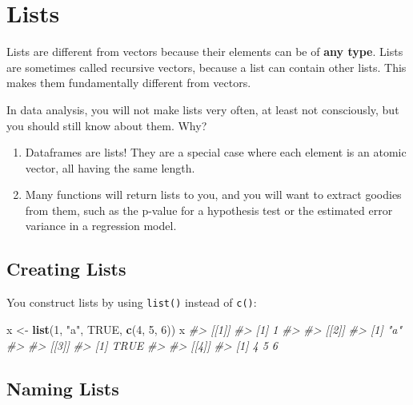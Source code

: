 \documentclass[
]{book}
\newenvironment{Shaded}{\begin{snugshade}}{\end{snugshade}}
\newcommand{\CommentTok}[1]{\textcolor[rgb]{0.56,0.35,0.01}{\textit{#1}}}
\newcommand{\DecValTok}[1]{\textcolor[rgb]{0.00,0.00,0.81}{#1}}
\newcommand{\KeywordTok}[1]{\textcolor[rgb]{0.13,0.29,0.53}{\textbf{#1}}}
\newcommand{\NormalTok}[1]{#1}
\newcommand{\OtherTok}[1]{\textcolor[rgb]{0.56,0.35,0.01}{#1}}
\newcommand{\StringTok}[1]{\textcolor[rgb]{0.31,0.60,0.02}{#1}}
\providecommand{\tightlist}{%
  \setlength{\itemsep}{0pt}\setlength{\parskip}{0pt}}
\begin{document}
\hypertarget{lists}{%
\section{Lists}\label{lists}}

Lists are different from vectors because their elements can be of \textbf{any type}. Lists are sometimes called recursive vectors, because a list can contain other lists. This makes them fundamentally different from vectors.

In data analysis, you will not make lists very often, at least not consciously, but you should still know about them. Why?

\begin{enumerate}
\def\labelenumi{\arabic{enumi}.}
\tightlist
\item
  Dataframes are lists! They are a special case where each element is an atomic vector, all having the same length.
\item
  Many functions will return lists to you, and you will want to extract goodies from them, such as the p-value for a hypothesis test or the estimated error variance in a regression model.
\end{enumerate}

\hypertarget{creating-lists}{%
\subsection{Creating Lists}\label{creating-lists}}

You construct lists by using \texttt{list()} instead of \texttt{c()}:

\begin{Shaded}
\begin{Highlighting}[]
\NormalTok{x <-}\StringTok{ }\KeywordTok{list}\NormalTok{(}\DecValTok{1}\NormalTok{, }\StringTok{"a"}\NormalTok{, }\OtherTok{TRUE}\NormalTok{, }\KeywordTok{c}\NormalTok{(}\DecValTok{4}\NormalTok{, }\DecValTok{5}\NormalTok{, }\DecValTok{6}\NormalTok{))}
\NormalTok{x}
\CommentTok{#> [[1]]}
\CommentTok{#> [1] 1}
\CommentTok{#> }
\CommentTok{#> [[2]]}
\CommentTok{#> [1] "a"}
\CommentTok{#> }
\CommentTok{#> [[3]]}
\CommentTok{#> [1] TRUE}
\CommentTok{#> }
\CommentTok{#> [[4]]}
\CommentTok{#> [1] 4 5 6}
\end{Highlighting}
\end{Shaded}

\hypertarget{naming-lists}{%
\subsection{Naming Lists}\label{naming-lists}}
\end{document}
